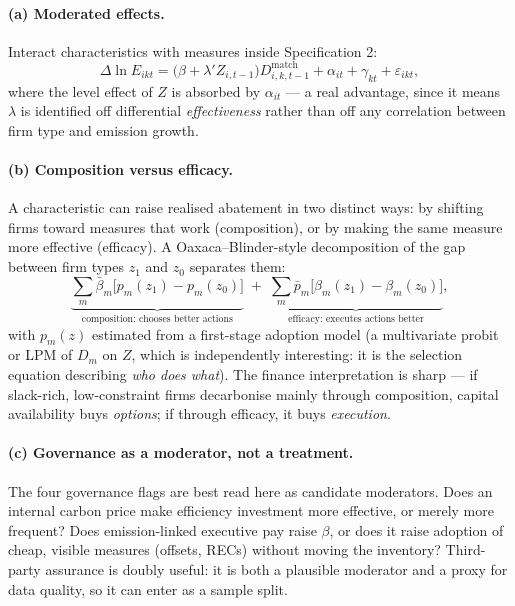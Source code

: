 \documentclass[11pt]{article}
\begin{document}
\paragraph{(a) Moderated effects.} Interact characteristics with measures
inside Specification 2:
\begin{equation}
\Delta \ln E_{ikt} = \big(\beta + \lambda' Z_{i,t-1}\big) D^{\text{match}}_{i,k,t-1}
+ \alpha_{it} + \gamma_{kt} + \varepsilon_{ikt},
\end{equation}
where the level effect of $Z$ is absorbed by $\alpha_{it}$ --- a real
advantage, since it means $\lambda$ is identified off differential
\emph{effectiveness} rather than off any correlation between firm type and
emission growth.

\paragraph{(b) Composition versus efficacy.} A characteristic can raise
realised abatement in two distinct ways: by shifting firms toward measures
that work (composition), or by making the same measure more effective
(efficacy). A Oaxaca--Blinder-style decomposition of the gap between firm
types $z_1$ and $z_0$ separates them:
\begin{equation}
\underbrace{\textstyle\sum_m \bar{\beta}_m \big[p_m(z_1)-p_m(z_0)\big]}_{\text{composition: chooses better actions}}
\;+\;
\underbrace{\textstyle\sum_m \bar{p}_m \big[\beta_m(z_1)-\beta_m(z_0)\big]}_{\text{efficacy: executes actions better}},
\end{equation}
with $p_m(z)$ estimated from a first-stage adoption model (a multivariate
probit or LPM of $D_m$ on $Z$, which is independently interesting: it is the
selection equation describing \emph{who does what}). The finance interpretation
is sharp --- if slack-rich, low-constraint firms decarbonise mainly through
composition, capital availability buys \emph{options}; if through efficacy, it
buys \emph{execution}.

\paragraph{(c) Governance as a moderator, not a treatment.} The four
governance flags are best read here as candidate moderators. Does an internal
carbon price make efficiency investment more effective, or merely more
frequent? Does emission-linked executive pay raise $\beta$, or does it raise
adoption of cheap, visible measures (offsets, RECs) without moving the
inventory? Third-party assurance is doubly useful: it is both a plausible
moderator and a proxy for data quality, so it can enter as a sample split.
\end{document}
